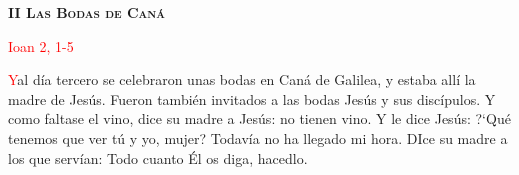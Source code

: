 \begin{center}
    \textbf{\textsc{II Las Bodas de Caná}}
    
    \textcolor{red}{Ioan 2, 1-5}
\end{center}

\lettrine[lines=2]{\textcolor{red}{Y}}\space al día tercero se celebraron unas bodas en Caná de Galilea, y estaba allí la madre de Jesús. Fueron también invitados a las bodas
Jesús y sus discípulos. Y como faltase el vino, dice su madre a Jesús: no tienen vino. Y le dice Jesús: {?`}Qué tenemos que ver tú y yo, mujer? Todavía no ha llegado mi hora.
DIce su madre a los que servían: Todo cuanto Él os diga, hacedlo.